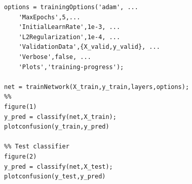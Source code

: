 \documentclass[12pt,letterpaper]{article}
\begin{document}
\begin{verbatim}
options = trainingOptions('adam', ...
    'MaxEpochs',5,...
    'InitialLearnRate',1e-3, ...
    'L2Regularization',1e-4, ...
    'ValidationData',{X_valid,y_valid}, ...
    'Verbose',false, ...
    'Plots','training-progress');

net = trainNetwork(X_train,y_train,layers,options);
%%
figure(1)
y_pred = classify(net,X_train);
plotconfusion(y_train,y_pred)

%% Test classifier
figure(2)
y_pred = classify(net,X_test);
plotconfusion(y_test,y_pred)
\end{verbatim}
\end{document}
